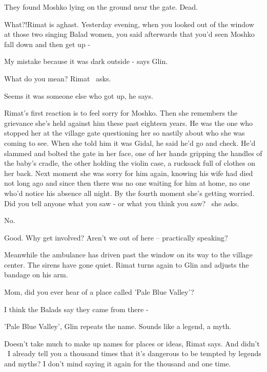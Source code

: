 \documentclass[letterpaper]{article}
\begin{document}
{\textquotedbl}They found Moshko lying on the ground near the gate. Dead.{\textquotedbl} 

{\textquotedbl}What?!{\textquotedbl}Rimat is aghast{. }{\textquotedbl}Yesterday evening, when you looked
out of the window at those two singing Balad women, you said afterwards that you'd seen Moshko fall down and then get
up -{\textquotedbl} 

{\textquotedbl}My mistake because it was dark outside -{\textquotedbl} says Glin.

{\textquotedbl}What do you mean?{\textquotedbl} Rimat \ asks. 

{\textquotedbl}Seems it was someone else who got up,{\textquotedbl} he says. 

Rimat's first reaction is to feel sorry for Moshko. Then she remembers the grievance she's held against him these
past{ }eighteen years. He was the one who stopped her at the village gate questioning her so nastily
about who she was coming to see. When she told him it was Gidal, he said he'd go and check. He'd slammed and bolted the
gate in her face, one of her hands gripping the handles of the baby's cradle, the other holding the violin case, a
rucksack full of clothes on her back. Next moment she was sorry for him again, knowing his wife had died not long ago
and since then there was no one waiting for him at home, no one who'd notice his absence all night. By the fourth
moment she's getting worried. {\textquotedbl}Did you tell anyone what you saw - or what you think you
saw?{\textquotedbl} \ she asks.

{\textquotedbl}No.{\textquotedbl}

{\textquotedbl}Good. Why get involved? Aren't we out of here -- practically speaking?{\textquotedbl} 

Meanwhile the ambulance has driven past the window on its way to the village center. The sirens have gone quiet. Rimat
turns again to Glin and adjusts the bandage on his arm.

{\textquotedbl}Mom, did you ever hear of a place called 'Pale Blue Valley'?{\textquotedbl}

{\textquotedbl}I think the Balads say they came from there -{\textquotedbl} 

{\textquotedbl}'Pale Blue Valley',{\textquotedbl} Glin repeats the name. {\textquotedbl}Sounds like a legend, a
myth.{\textquotedbl} 

{\textquotedbl}Doesn't take much to make up names for places or ideas,{\textquotedbl} Rimat says. {\textquotedbl}And
didn't \ I already tell you a thousand times that it's dangerous to be tempted by legends and myths? I don't mind
saying it again for the thousand and one time.{\textquotedbl} 
\end{document}
